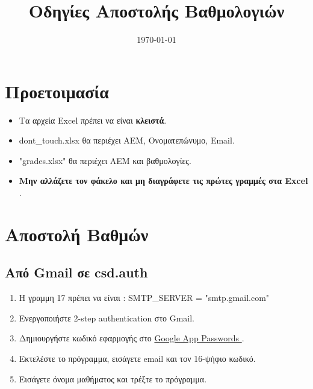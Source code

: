\documentclass[a4paper,12pt]{article}
\title{Οδηγίες Αποστολής Βαθμολογιών}
\date{\today}
\begin{document}
\maketitle

\section{Προετοιμασία}
\begin{itemize}
    \item Τα αρχεία  Excel  πρέπει να είναι \textbf{κλειστά}.
    \item {}  dont\_touch.xlsx   θα περιέχει ΑΕΜ, Ονοματεπώνυμο, Email.
    \item {}"grades.xlsx"  θα περιέχει ΑΕΜ και βαθμολογίες.
    \item \textbf{Μην αλλάζετε τον φάκελο και μη διαγράφετε τις πρώτες γραμμές στα   Excel }.
\end{itemize}

\section{Αποστολή Βαθμών}
\subsection{Από  Gmail  σε  csd.auth }
\begin{enumerate}
    \item H γραμμη 17 πρέπει να είναι :  SMTP\_SERVER = "smtp.gmail.com"
    \item Ενεργοποιήστε  2-step authentication  στο  Gmail. 
    \item Δημιουργήστε κωδικό εφαρμογής στο \href{https://myaccount.google.com/apppasswords}{ Google App Passwords }.
    \item Εκτελέστε το πρόγραμμα, εισάγετε  email  και τον 16-ψήφιο κωδικό.
    \item Εισάγετε όνομα μαθήματος και τρέξτε το πρόγραμμα.
\end{enumerate}
\end{document}
